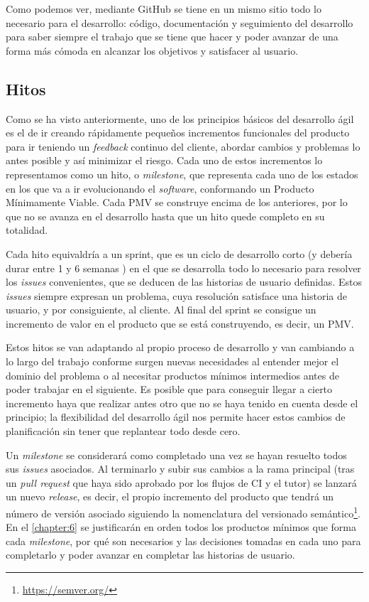 Como podemos ver, mediante GitHub se tiene en un mismo sitio todo lo necesario
para el desarrollo: código, documentación y seguimiento del desarrollo para
saber siempre el trabajo que se tiene que hacer y poder avanzar de una forma más
cómoda en alcanzar los objetivos y satisfacer al usuario. 

\subsection{Hitos}
Como se ha visto anteriormente, uno de los principios básicos del desarrollo
ágil es el de ir creando rápidamente pequeños incrementos funcionales del
producto para ir teniendo un \textit{feedback} continuo del cliente, abordar
cambios y problemas lo antes posible y así minimizar el riesgo. Cada uno de
estos incrementos lo representamos como un hito, o \textit{milestone}, que
representa cada uno de los estados en los que va a ir evolucionando el
\textit{software}, conformando un Producto Mínimamente Viable. Cada PMV se
construye encima de los anteriores, por lo que no se avanza en el desarrollo
hasta que un hito quede completo en su totalidad. 

Cada hito equivaldría a un sprint, que es un ciclo de desarrollo corto (y
debería durar entre 1 y 6 semanas \cite{abrahamsson2017agile}) en el que se
desarrolla todo lo necesario para resolver los \textit{issues} convenientes, que
se deducen de las historias de usuario definidas. Estos \textit{issues} siempre
expresan un problema, cuya resolución satisface una historia de usuario, y por
consiguiente, al cliente. Al final del sprint se consigue un incremento de valor
en el producto que se está construyendo, es decir, un PMV. 

Estos hitos se van adaptando al propio proceso de desarrollo y van cambiando a
lo largo del trabajo conforme surgen nuevas necesidades al entender mejor el
dominio del problema o al necesitar productos mínimos intermedios antes de poder
trabajar en el siguiente. Es posible que para conseguir llegar a cierto
incremento haya que realizar antes otro que no se haya tenido en cuenta desde el
principio; la flexibilidad del desarrollo ágil nos permite hacer estos cambios
de planificación sin tener que replantear todo desde cero.

Un \textit{milestone} se considerará como completado una vez se hayan resuelto
todos sus \textit{issues} asociados. Al terminarlo y subir sus cambios a la rama
principal (tras un \textit{pull request} que haya sido aprobado por los flujos
de CI y el tutor) se lanzará un nuevo \textit{release}, es decir, el propio
incremento del producto que tendrá un número de versión asociado siguiendo la
nomenclatura del versionado semántico\footnote{\url{https://semver.org/}}. En el
\autoref{chapter:6} se justificarán en orden todos los productos mínimos que
forma cada \textit{milestone}, por qué son necesarios y las decisiones tomadas
en cada uno para completarlo y poder avanzar en completar las historias de
usuario.

